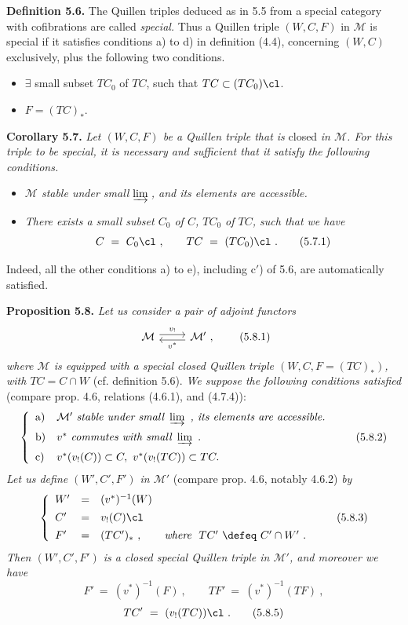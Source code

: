 \textbf{Definition 5.6.} The Quillen triples deduced as in 5.5 from a special category with cofibrations are called \textit{special.} Thus a Quillen triple $(W, C, F)$ in $\mathcal{M}$ is special if it satisfies conditions a) to d) in definition (4.4), concerning $(W, C)$ exclusively, plus the following two conditions.

\begin{itemize}[leftmargin=3em]
\item[\encircled{c$'$}] $\exists$ small subset $TC_0$ of $TC$, such that $TC \subset (TC_0)\cl$.
\item[\encircled{e}] $F = (TC)_*$.
\end{itemize}

\textbf{Corollary 5.7.} \textit{Let $(W, C, F)$ be a Quillen triple that is} closed \textit{in $\mathcal{M}$. For this triple to be special, it is necessary and sufficient that it satisfy the following conditions.}
\begin{itemize}[leftmargin=3em]
\item[\encircled{a}] \textit{$\mathcal{M}$ stable under small $\varinjlim$\,, and its elements are accessible.}
\item[\encoval{c, c$'$}] \textit{There exists a small subset $C_0$ of $C$, $TC_0$ of $TC$, such that we have}
\[
C \ = \ C_0\cl\ , \qquad TC \ = \ (TC_0)\cl\ .
\tag*{(5.7.1)}
\]
\end{itemize}
Indeed, all the other conditions a) to e), including c$'$) of 5.6, are automatically satisfied.

\textbf{Proposition 5.8.} \textit{Let us consider a pair of adjoint functors}
\[
\begin{tikzcd}
\mathcal{M} \arrow[r, shift left, "v_!"] & \mathcal{M}' \arrow[l, shift left, "v^*"] \ ,
\end{tikzcd}
\tag*{(5.8.1)}
\]
\textit{where $\mathcal{M}$ is equipped with a special closed Quillen triple $(W, C, F = (TC)_*)$, with $TC = C \cap W$} (cf. definition 5.6). \textit{We suppose the following conditions satisfied} (compare prop. 4.6, relations (4.6.1), and (4.7.4)):
\[
\left\{
\begin{array}{ll}
\text{a)} & \mathcal{M}' \ \textit{stable under small}\ \varinjlim\ \textit{, its elements are accessible.}\\[1.5ex]
\text{b)} & v^* \ \textit{commutes with small}\ \varinjlim\ .\\[1.5ex]
\text{c)} & v^*(v_!(C)) \subset C,\ v^*(v_!(TC)) \subset TC.
\end{array}
\right.
\tag*{(5.8.2)}
\]
\textit{Let us define $(W', C', F')$ in $\mathcal{M}'$} (compare prop. 4.6, notably 4.6.2) \textit{by}
\[
\left\{
\begin{array}{lcl}
W' & = & (v^*)^{-1}(W)\\[1ex]
C' & = & v_!(C)\cl\\[1ex]
F' & = & (TC')_*\ , \qquad \textit{where}\ \ TC' \ \defeq \ C' \cap W'\ .
\end{array}
\right.
\tag*{(5.8.3)}
\]
\textit{Then $(W', C', F')$ is a closed special Quillen triple in $\mathcal{M}'$, and moreover we have}
\[
F' \ = \ (v^*)^{-1}(F)\ , \qquad TF' \ = \ (v^*)^{-1}(TF)\ ,
\tag*{(5.8.4)}
\]
\[
TC' \ = \ (v_!(TC))\cl\ .
\tag*{(5.8.5)}
\]


